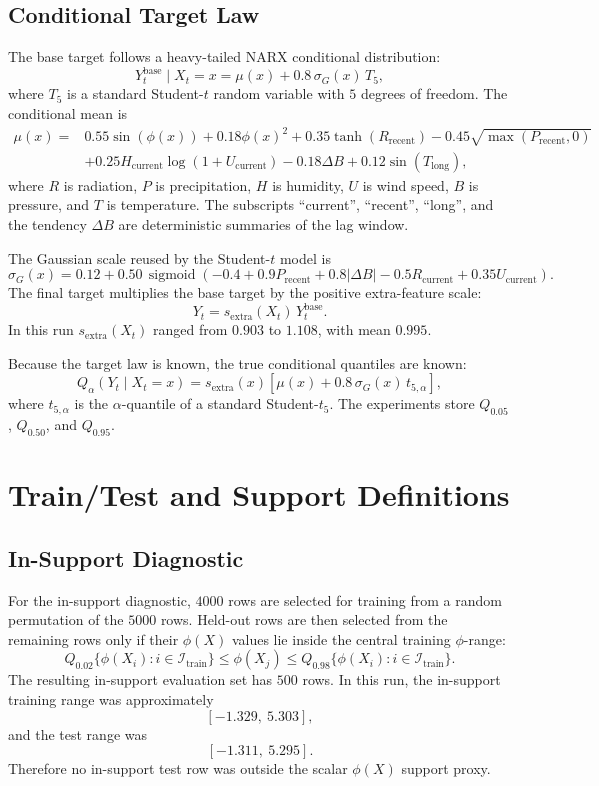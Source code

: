 \documentclass[11pt]{article}
\begin{document}
\subsection{Conditional Target Law}

The base target follows a heavy-tailed NARX conditional distribution:
\[
  Y_t^{\mathrm{base}} \mid X_t=x
  =
  \mu(x) + 0.8\,\sigma_G(x)\,T_5,
\]
where \(T_5\) is a standard Student-\(t\) random variable with \(5\) degrees of
freedom.  The conditional mean is
\[
\begin{aligned}
\mu(x)
={}&
0.55\sin(\phi(x))
+0.18\phi(x)^2
+0.35\tanh(R_{\mathrm{recent}})
-0.45\sqrt{\max(P_{\mathrm{recent}},0)}
\\
&+0.25H_{\mathrm{current}}\log(1+U_{\mathrm{current}})
-0.18\Delta B
+0.12\sin(T_{\mathrm{long}}),
\end{aligned}
\]
where \(R\) is radiation, \(P\) is precipitation, \(H\) is humidity,
\(U\) is wind speed, \(B\) is pressure, and \(T\) is temperature.  The
subscripts ``current'', ``recent'', ``long'', and the tendency
\(\Delta B\) are deterministic summaries of the lag window.

The Gaussian scale reused by the Student-\(t\) model is
\[
\sigma_G(x)
=
0.12
+0.50\,
\operatorname{sigmoid}\!\left(
-0.4
+0.9P_{\mathrm{recent}}
+0.8|\Delta B|
-0.5R_{\mathrm{current}}
+0.35U_{\mathrm{current}}
\right).
\]
The final target multiplies the base target by the positive extra-feature
scale:
\[
  Y_t = s_{\mathrm{extra}}(X_t)\,Y_t^{\mathrm{base}}.
\]
In this run \(s_{\mathrm{extra}}(X_t)\) ranged from \(0.903\) to \(1.108\), with
mean \(0.995\).

Because the target law is known, the true conditional quantiles are known:
\[
  Q_\alpha(Y_t\mid X_t=x)
  =
  s_{\mathrm{extra}}(x)
  \left[
  \mu(x) + 0.8\,\sigma_G(x)\,t_{5,\alpha}
  \right],
\]
where \(t_{5,\alpha}\) is the \(\alpha\)-quantile of a standard
Student-\(t_5\).  The experiments store \(Q_{0.05}\), \(Q_{0.50}\), and
\(Q_{0.95}\).

\section{Train/Test and Support Definitions}

\subsection{In-Support Diagnostic}

For the in-support diagnostic, \(4000\) rows are selected for training from a
random permutation of the \(5000\) rows.  Held-out rows are then selected from
the remaining rows only if their \(\phi(X)\) values lie inside the central
training \(\phi\)-range:
\[
  Q_{0.02}\{\phi(X_i): i\in \mathcal{I}_{\mathrm{train}}\}
  \le \phi(X_j) \le
  Q_{0.98}\{\phi(X_i): i\in \mathcal{I}_{\mathrm{train}}\}.
\]
The resulting in-support evaluation set has \(500\) rows.  In this run, the
in-support training range was approximately
\[
  [-1.329,\ 5.303],
\]
and the test range was
\[
  [-1.311,\ 5.295].
\]
Therefore no in-support test row was outside the scalar \(\phi(X)\) support
proxy.
\end{document}
